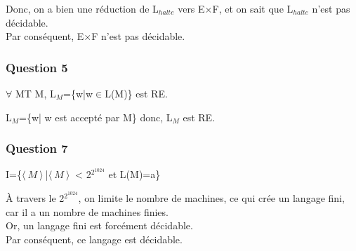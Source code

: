 Donc, on a bien une réduction de L$_{halte}$ vers E$\times$F, et on sait que L$_{halte}$ n'est pas décidable.\\
Par conséquent, E$\times$F n'est pas décidable.

\subsubsection{Question 5}

$\forall$ MT M, L$_M$=\{w|w$\in$L(M)\} est RE.

L$_M$=\{w| w est accepté par M\} donc, L$_M$ est RE.

\subsubsection{Question 7}

I=\{$\langle\ M\ \rangle \!\ $|$\langle\ M\ \rangle \!\ $ < 2$^{2^{1024}}$ et L(M)={a}\}

À travers le 2$^{2^{1024}}$, on limite le nombre de machines, ce qui crée un langage fini, car il a un nombre de machines finies.\\
Or, un langage fini est forcément décidable.\\
Par conséquent, ce langage est décidable.

